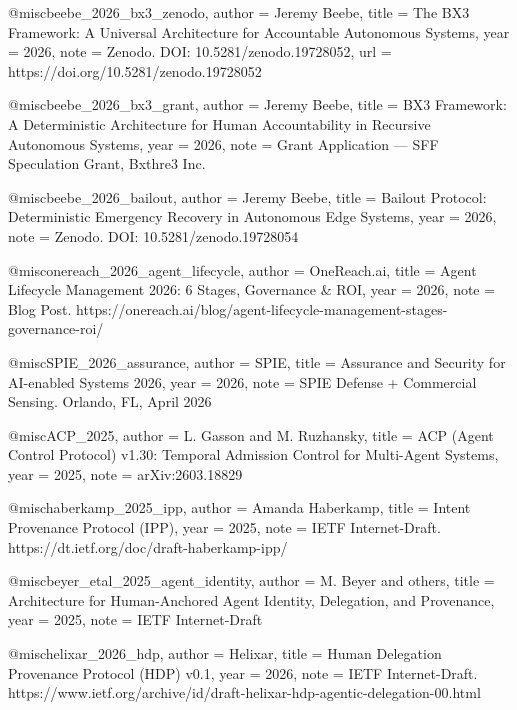 
@misc{beebe_2026_bx3_zenodo,
  author       = {Jeremy Beebe},
  title        = {The BX3 Framework: A Universal Architecture for Accountable Autonomous Systems},
  year         = {2026},
  note         = {Zenodo. DOI: 10.5281/zenodo.19728052},
  url          = {https://doi.org/10.5281/zenodo.19728052}
}

@misc{beebe_2026_bx3_grant,
  author       = {Jeremy Beebe},
  title        = {BX3 Framework: A Deterministic Architecture for Human Accountability in Recursive Autonomous Systems},
  year         = {2026},
  note         = {Grant Application — SFF Speculation Grant, Bxthre3 Inc.}
}

@misc{beebe_2026_bailout,
  author       = {Jeremy Beebe},
  title        = {Bailout Protocol: Deterministic Emergency Recovery in Autonomous Edge Systems},
  year         = {2026},
  note         = {Zenodo. DOI: 10.5281/zenodo.19728054}
}

@misc{onereach_2026_agent_lifecycle,
  author       = {OneReach.ai},
  title        = {Agent Lifecycle Management 2026: 6 Stages, Governance {\&} ROI},
  year         = {2026},
  note         = {Blog Post. https://onereach.ai/blog/agent-lifecycle-management-stages-governance-roi/}
}

@misc{SPIE_2026_assurance,
  author       = {SPIE},
  title        = {Assurance and Security for AI-enabled Systems 2026},
  year         = {2026},
  note         = {SPIE Defense + Commercial Sensing. Orlando, FL, April 2026}
}

@misc{ACP_2025,
  author       = {L. Gasson and M. Ruzhansky},
  title        = {ACP (Agent Control Protocol) v1.30: Temporal Admission Control for Multi-Agent Systems},
  year         = {2025},
  note         = {arXiv:2603.18829}
}

@misc{haberkamp_2025_ipp,
  author       = {Amanda Haberkamp},
  title        = {Intent Provenance Protocol (IPP)},
  year         = {2025},
  note         = {IETF Internet-Draft. https://dt.ietf.org/doc/draft-haberkamp-ipp/}
}

@misc{beyer_etal_2025_agent_identity,
  author       = {M. Beyer and others},
  title        = {Architecture for Human-Anchored Agent Identity, Delegation, and Provenance},
  year         = {2025},
  note         = {IETF Internet-Draft}
}

@misc{helixar_2026_hdp,
  author       = {Helixar},
  title        = {Human Delegation Provenance Protocol (HDP) v0.1},
  year         = {2026},
  note         = {IETF Internet-Draft. https://www.ietf.org/archive/id/draft-helixar-hdp-agentic-delegation-00.html}
}

